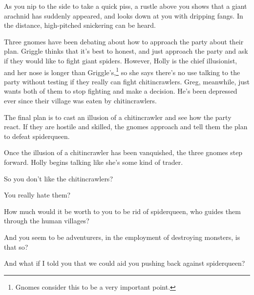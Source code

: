 \begin{figure}
	\label{ruined_village_map}\label{ruined_village_map}
\end{figure}


\chitincrawler

\begin{multicols}{2}


\begin{boxtext}
	As you nip to the side to take a quick piss, a rustle above you shows that a giant arachnid has suddenly appeared, and looks down at you with dripping fangs.  In the distance, high-pitched snickering can be heard.
\end{boxtext}

Three gnomes have been debating about how to approach the party about their plan.
Griggle thinks that it's best to honest, and just approach the party and ask if they would like to fight giant spiders.
However, Holly is the chief illusionist, and her nose is longer than Griggle's,\footnote{Gnomes consider this to be a very important point.} so she says there's no use talking to the party without testing if they really can fight chitincrawlers.
Greg, meanwhile, just wants both of them to stop fighting and make a decision.
He's been depressed ever since their village was eaten by chitincrawlers.

The final plan is to cast an illusion of a chitincrawler and see how the party react.  If they are hostile and skilled, the gnomes approach and tell them the plan to defeat \gls{spiderqueen}.

Once the illusion of a chitincrawler has been vanquished, the three gnomes step forward.
Holly begins talking like she's some kind of trader.

\begin{speechtext}

	So you don't like the chitincrawlers?

	You really hate them?

	How much would it be worth to you to be rid of \gls{spiderqueen}, who guides them through the human villages?

	And you seem to be adventurers, in the employment of destroying monsters, is that so?

	And what if I told you that we could aid you pushing back against \gls{spiderqueen}?


\end{speechtext}
\end{multicols}
